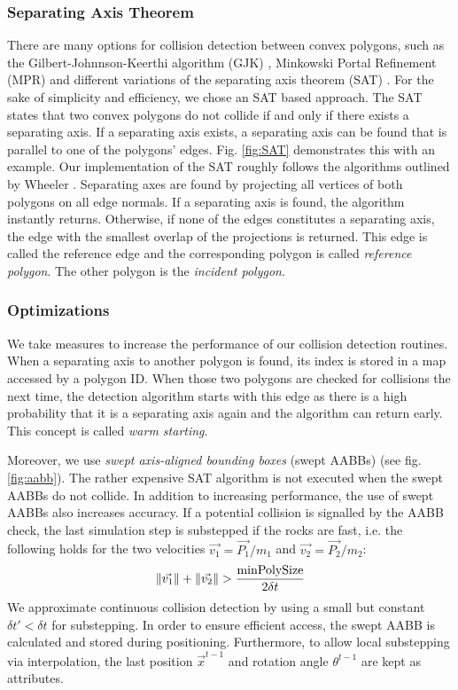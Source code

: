 \subsubsection{Separating Axis Theorem}

There are many options for collision detection between convex polygons, such as the Gilbert-Johnnson-Keerthi algorithm (GJK) \cite{GJK}, Minkowski Portal Refinement (MPR) \cite{gemsMPR} and different variations of the separating axis theorem (SAT) \cite{geometrySAT}.
For the sake of simplicity and efficiency, we chose an SAT based approach.
The SAT states that two convex polygons do not collide if and only if there exists a separating axis.
If a separating axis exists, a separating axis can be found that is parallel to one of the polygons' edges.
Fig. \ref{fig:SAT} demonstrates this with an example.
Our implementation of the SAT roughly follows the algorithms outlined by Wheeler \cite{wheelerCD}.
Separating axes are found by projecting all vertices of both polygons on all edge normals.
If a separating axis is found, the algorithm instantly returns.
Otherwise, if none of the edges constitutes a separating axis, the edge with the smallest overlap of the projections is returned.
This edge is called the reference edge and the corresponding polygon is called \emph{reference polygon}.
The other polygon is the \emph{incident polygon}.

\subsubsection{Optimizations}\label{sec:opt}

We take measures to increase the performance of our collision detection routines.
When a separating axis to another polygon is found, its index is stored in a map accessed by a polygon ID.
When those two polygons are checked for collisions the next time, the detection algorithm starts with this edge as there is a high probability that it is a separating axis again and the algorithm can return early.
This concept is called \emph{warm starting}.

Moreover, we use \emph{swept axis-aligned bounding boxes} (swept AABBs) \cite{sweptAABB, tutorial} (see fig. \ref{fig:aabb}).
The rather expensive SAT algorithm is not executed when the swept AABBs do not collide.
In addition to increasing performance, the use of swept AABBs also increases accuracy.
If a potential collision is signalled by the AABB check, the last simulation step is substepped if the rocks are \glqq fast\grqq{}, i.e. the following holds for the two velocities $\vec{v_1} = \vec{P_1}/m_1$ and $\vec{v_2} =  \vec{P_2}/m_2$:
\begin{equation}
  \lVert\vec{v_1}\rVert + \lVert\vec{v_2}\rVert > \frac{\text{minPolySize}}{2\delta t} 
\end{equation}
We approximate continuous collision detection by using a small but constant $\delta t' < \delta t$ for substepping.
In order to ensure efficient access, the swept AABB is calculated and stored during positioning.
Furthermore, to allow local substepping via interpolation, the last position $\vec{x}^{t-1}$ and rotation angle $\theta^{t-1}$ are kept as attributes.

